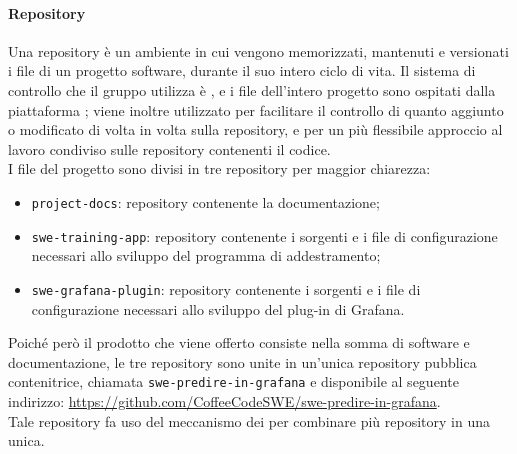 \documentclass[../norme-di-progetto.tex]{subfiles}
\begin{document}
\paragraph{Repository}
Una repository è un ambiente in cui vengono memorizzati, mantenuti e versionati i file di un progetto software, durante il suo intero ciclo di vita. Il sistema di controllo che il gruppo utilizza è , e i file dell'intero progetto sono ospitati dalla piattaforma ; viene inoltre utilizzato  per facilitare il controllo di quanto aggiunto o modificato di volta in volta sulla repository, e  per un più flessibile approccio al lavoro condiviso sulle repository contenenti il codice. \\
I file del progetto sono divisi in tre repository per maggior chiarezza:
\begin{itemize}
  \item \texttt{project-docs}: repository contenente la documentazione;
  \item \texttt{swe-training-app}: repository contenente i sorgenti e i file di configurazione necessari allo sviluppo del programma di addestramento;
  \item \texttt{swe-grafana-plugin}: repository contenente i sorgenti e i file di configurazione necessari allo sviluppo del plug-in di Grafana.
\end{itemize}
Poiché però il prodotto che viene offerto consiste nella somma di software e documentazione, le tre repository sono unite in un'unica repository pubblica contenitrice, chiamata \texttt{swe-predire-in-grafana} e disponibile al seguente indirizzo: \href{https://github.com/CoffeeCodeSWE/swe-predire-in-grafana}{https://github.com/CoffeeCodeSWE/swe-predire-in-grafana}. \\
Tale repository fa uso del meccanismo dei  per combinare più repository in una unica.
\end{document}
